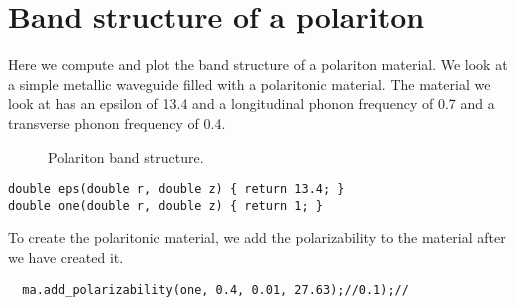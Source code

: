 \section{Band structure of a polariton}

\begin{comment}
#include <stdio.h>
#include <stdlib.h>
#include <signal.h>

#include "dactyl.h"

static int stopnow = 0;
void handle_control_c(int i) {
  printf("Be patient, I'll stop as soon as it's convenient...\n");
  stopnow = 1;
}

const double rmax = 1.0;
\end{comment}

Here we compute and plot the band structure of a polariton material.  We
look at a simple metallic waveguide filled with a polaritonic material.
The material we look at has an epsilon of 13.4 and a longitudinal phonon
frequency of 0.7 and a transverse phonon frequency of 0.4.

\begin{figure}
\label{polaritonbands}
\caption{Polariton band structure.}
\end{figure}

\begin{verbatim}
double eps(double r, double z) { return 13.4; }
double one(double r, double z) { return 1; }
\end{verbatim}

\begin{comment}
int main(int argc, char **argv) {
  signal(SIGINT, handle_control_c);
  const int rad = 10;
  const int m = 0;
  double k;
  const int ttot = 1000*rad;  
\end{comment}

\begin{comment}
  mat ma(eps, rmax, 0.0, rad);
  const char *dirname = make_output_directory(argv[0]);
  printf("Storing output in directory %
  FILE *ban = create_output_file(dirname, "bands");
  ma.set_output_directory(dirname);
\end{comment}

To create the polaritonic material, we add the polarizability to the
material after we have created it.

\begin{verbatim}
  ma.add_polarizability(one, 0.4, 0.01, 27.63);//0.1);//
\end{verbatim}

